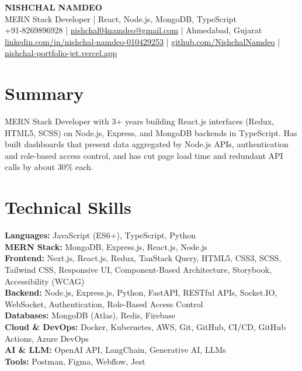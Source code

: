 \documentclass[a4paper,10pt]{article}
\begin{document}
\begin{center}
  {\LARGE \textbf{NISHCHAL NAMDEO}}\\[3pt]
  MERN Stack Developer | React, Node.js, MongoDB, TypeScript\\[3pt]
  +91-8269896928 | \href{mailto:nishchal04namdeo@gmail.com}{nishchal04namdeo@gmail.com} | Ahmedabad, Gujarat\\[2pt]
  \href{https://www.linkedin.com/in/nishchal-namdeo-010429253/}{linkedin.com/in/nishchal-namdeo-010429253} |
  \href{https://github.com/NishchalNamdeo}{github.com/NishchalNamdeo} |
  \href{https://nishchal-portfolio-jet.vercel.app/}{nishchal-portfolio-jet.vercel.app}
\end{center}

\section{Summary}
MERN Stack Developer with 3+ years building React.js interfaces (Redux, HTML5, SCSS) on Node.js, Express, and MongoDB backends in TypeScript. Has built dashboards that present data aggregated by Node.js APIs, authentication and role-based access control, and has cut page load time and redundant API calls by about 30\% each.

\section{Technical Skills}
\textbf{Languages:} JavaScript (ES6+), TypeScript, Python\\
\textbf{MERN Stack:} MongoDB, Express.js, React.js, Node.js\\
\textbf{Frontend:} Next.js, React.js, Redux, TanStack Query, HTML5, CSS3, SCSS, Tailwind CSS, Responsive UI, Component-Based Architecture, Storybook, Accessibility (WCAG)\\
\textbf{Backend:} Node.js, Express.js, Python, FastAPI, RESTful APIs, Socket.IO, WebSocket, Authentication, Role-Based Access Control\\
\textbf{Databases:} MongoDB (Atlas), Redis, Firebase\\
\textbf{Cloud \& DevOps:} Docker, Kubernetes, AWS, Git, GitHub, CI/CD, GitHub Actions, Azure DevOps\\
\textbf{AI \& LLM:} OpenAI API, LangChain, Generative AI, LLMs\\
\textbf{Tools:} Postman, Figma, Webflow, Jest
\end{document}
